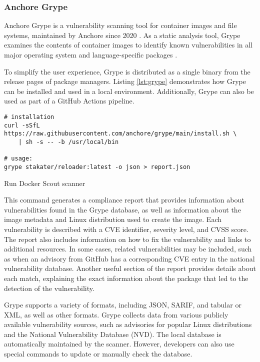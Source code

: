 \subsubsection{Anchore Grype}

Anchore Grype is a vulnerability scanning tool for container images and file systems, maintained by Anchore since 2020 \cite{s:anchore}. As a static analysis tool, Grype examines the contents of container images to identify known vulnerabilities in all major operating system and language-specific packages \cite{gh:grype}.

To simplify the user experience, Grype is distributed as a single binary from the release pages of package managers. Listing \ref{lst:grype} demonstrates how Grype can be installed and used in a local environment. Additionally, Grype can also be used as part of a GitHub Actions pipeline.


\begin{listing}[htp]
    \centering
    \begin{minipage}{1\linewidth}
        \begin{verbatim}
# installation
curl -sSfL https://raw.githubusercontent.com/anchore/grype/main/install.sh \
    | sh -s -- -b /usr/local/bin

# usage:
grype stakater/reloader:latest -o json > report.json
        \end{verbatim}
    \end{minipage}
    \caption{Run Docker Scout scanner}
    \label{lst:grype}
\end{listing}

This command generates a compliance report that provides information about vulnerabilities found in the Grype database, as well as information about the image metadata and Linux distribution used to create the image. Each vulnerability is described with a CVE identifier, severity level, and CVSS score. The report also includes information on how to fix the vulnerability and links to additional resources. In some cases, related vulnerabilities may be included, such as when an advisory from GitHub has a corresponding CVE entry in the national vulnerability database. Another useful section of the report provides details about each match, explaining the exact information about the package that led to the detection of the vulnerability.

Grype supports a variety of formats, including JSON, SARIF, and tabular or XML, as well as other formats. Grype collects data from various publicly available vulnerability sources, such as advisories for popular Linux distributions and the National Vulnerability Database (NVD). The local database is automatically maintained by the scanner. However, developers can also use special commands to update or manually check the database.


